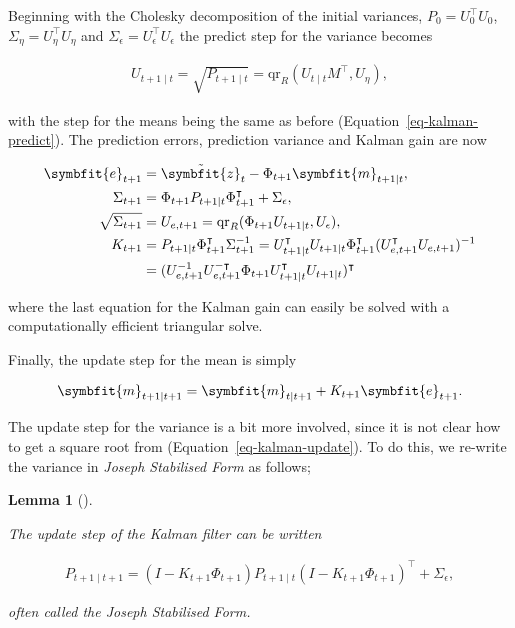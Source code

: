 \documentclass[
]{report}
\newcommand{\bv}[1]{\symbfit{#1}}
\theoremstyle{plain}
\newtheorem{lemma}{Lemma}[section]
\theoremstyle{plain}
\theoremstyle{remark}
\begin{document}
Beginning with the Cholesky decomposition of the initial variances,
\(P_0 = U_0^\intercal U_0\),
\(\Sigma_{\eta} = U_{\eta}^\intercal U_{\eta}\) and
\(\Sigma_\epsilon = U_{\epsilon}^\intercal U_{\epsilon}\) the predict
step for the variance becomes

\[\begin{split}
U_{t+1\mid t} = \sqrt{P_{t+1\mid t}} = \mathrm{qr}_R(U_{t\mid t} M^\intercal, U_{\eta}),
\end{split}
\]

with the step for the means being the same as before
(Equation~\ref{eq-kalman-predict}). The prediction errors, prediction
variance and Kalman gain are now

\[\begin{split}
  \bv e_{t+1} &= \tilde{\bv z}_t - \Phi_{t+1} \bv m_{t+1\mid t},\\
  \Sigma_{t+1} &= \Phi_{t+1} P_{t+1\mid t} \Phi_{t+1}^\intercal + \Sigma_\epsilon,\\
  \sqrt{\Sigma_{t+1}} &= U_{e, t+1} = \mathrm{qr}_R(\Phi_{t+1} U_{t+1\mid t}, U_\epsilon),\\
  K_{t+1} &= P_{t+1\mid t} \Phi_{t+1}^\intercal \Sigma_{t+1}^{-1} = U_{t+1\mid t}^\intercal U_{t+1\mid t} \Phi_{t+1}^\intercal (U_{e, t+1}^\intercal U_{e, t+1})^{-1}\\
  &= (U_{e, t+1}^{-1}U_{e, t+1}^{-\intercal}\Phi_{t+1}U_{t+1\mid t}^\intercal U_{t+1\mid t})^\intercal
\end{split}
\]

where the last equation for the Kalman gain can easily be solved with a
computationally efficient triangular solve.

Finally, the update step for the mean is simply

\[\begin{split}
  \bv m_{t+1\mid t+1} = \bv m_{t \mid t+1} + K_{t+1} {\bv e_{t+1}}.
\end{split}
\]

The update step for the variance is a bit more involved, since it is not
clear how to get a square root from (Equation~\ref{eq-kalman-update}).
To do this, we re-write the variance in \emph{Joseph Stabilised Form} as
follows;

\begin{lemma}[]\protect\hypertarget{lem-stable_form}{}\label{lem-stable_form}

The update step of the Kalman filter can be written

\[\begin{split}
  P_{t+1\mid t+1}= (I - K_{t+1} \Phi_{t+1}) P_{t+1\mid t}(I - K_{t+1} \Phi_{t+1})^\intercal + \Sigma_{\epsilon},
\end{split}
\]

often called the \emph{Joseph Stabilised Form}.

\end{lemma}
\end{document}
